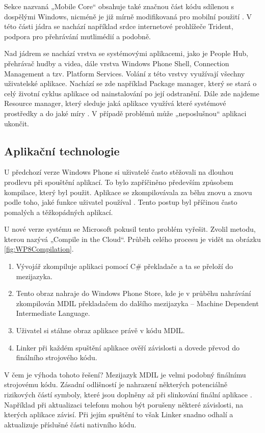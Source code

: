 Sekce nazvaná „Mobile Core“ obsahuje také značnou část kódu sdílenou s dospělými Windows, nicméně je již mírně modifikovaná pro mobilní použití \cite{wp8_kernel_architecture}. V této části jádra se nachází například srdce internetové prohlížeče Trident, podpora pro přehrávání mutlimédií a podobně.

Nad jádrem se nachází vrstva se systémovými aplikacemi, jako je People Hub, přehrávač hudby a videa, dále vrstva Windows Phone Shell, Connection Management a tzv. Platform Services. Volání z této vrstvy využívají všechny uživatelské aplikace. Nachází se zde například Package manager, který se stará o celý životní cyklus aplikace od nainstalování po její odstranění. Dále zde najdeme Resource manager, který sleduje jaká aplikace využívá které systémové prostředky a do jaké míry \cite{wp8_kernel_architecture}. V případě problémů může „neposlušnou“ aplikaci ukončit.

\subsection{Aplikační technologie}
U předchozí verze Windows Phone si uživatelé často stěžovali na dlouhou prodlevu při spouštění aplikací. To bylo zapříčiněno především způsobem kompilace, který byl použit. Aplikace se zkompilovávala za běhu znovu a znovu podle toho, jaké funkce uživatel používal \cite{wp8_compile_cloud}. Tento postup byl příčinou často pomalých a těžkopádných aplikací.

U nové verze systému se Microsoft pokusil tento problém vyřešit. Zvolil metodu, kterou nazývá „Compile in the Cloud“. Průběh celého procesu je vidět na obrázku \ref{fig:WP8Compilation}. 

\begin{enumerate}
	\item Vývojář zkompiluje aplikaci pomocí C\# překladače a ta se přeloží do mezijazyka.
	\item Tento obraz nahraje do Windows Phone Store, kde je v průběhu nahrávání zkompilován MDIL překladačem do dalšího mezijazyka – Machine Dependent Intermediate Language.
	\item Uživatel si stáhne obraz aplikace právě v kódu MDIL.
	\item Linker při každém spuštění aplikace ověří závislosti a dovede převod do finálního strojového kódu.
\end{enumerate}

V čem je výhoda tohoto řešení? Mezijazyk MDIL je velmi podobný finálnímu strojovému kódu. Zásadní odlišností je nahrazení některých potenciálně rizikových částí symboly, které jsou doplněny až při slinkování finální aplikace \cite{wp8_compile_cloud}. Například při aktualizaci telefonu mohou být porušeny některé závislosti, na kterých aplikace závisí. Při jejím spuštění to však Linker snadno odhalí a aktualizuje příslušné části nativního kódu.

